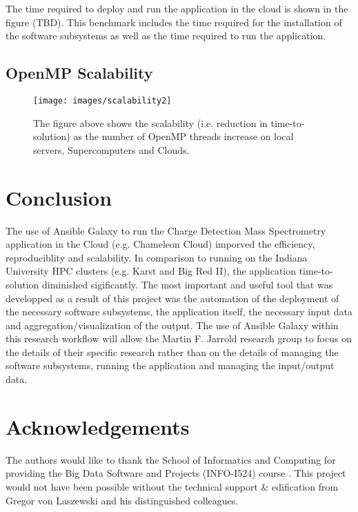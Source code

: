 \documentclass[9pt,twocolumn,twoside]{../../styles/osajnl}
\begin{document}
The time required to deploy and run the application in the cloud is
shown in the figure (TBD). This benchmark includes the time required
for the installation of the software subsystems as well as the time
required to run the application. 

\subsection{OpenMP Scalability} \label{scalability}
\begin{figure}
\centering
\texttt{[image: images/scalability2]}
\caption{The figure above shows the scalability (i.e. reduction in time-to-solution) as the number of OpenMP threads increase on local servers, Supercomputers and Clouds.}
\label{fig:scalability2}
\end{figure}

\section{Conclusion} \label{conclusion}
The use of Ansible Galaxy to run the Charge Detection Mass
Spectrometry application in the Cloud (e.g. Chameleon Cloud) imporved
the efficiency, reproduciblity and scalability. In comparison to
running on the Indiana University HPC clusters (e.g. Karst and Big Red
II), the application time-to-solution diminished sigificantly. The
most important and useful tool that was developped as a result of this
project was the automation of the deployment of the necessary software
subsystems, the application itself, the necessary input data and
aggregation/visualization of the output. The use of Ansible Galaxy
within this research workflow will allow the Martin F. Jarrold
research group to focus on the details of their specific research
rather than on the details of managing the software subsystems,
running the application and managing the input/output data.

\section*{Acknowledgements}
The authors would like to thank the School of Informatics and
Computing for providing the Big Data Software and Projects (INFO-I524)
course \cite{www-i524}. This project would not have been possible
without the technical support \& edification from Gregor von Laszewski
and his distinguished colleagues.

 
\end{document}
